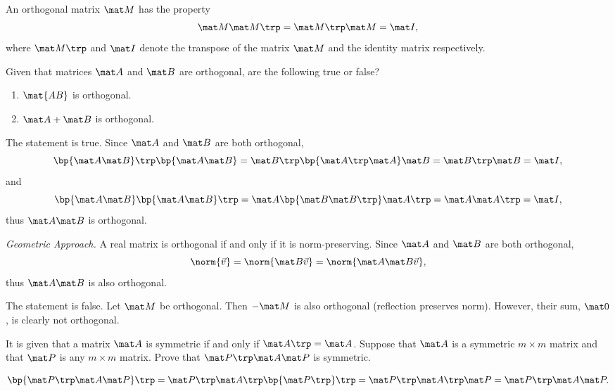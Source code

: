 \begin{problem}
    An orthogonal matrix $\mat M$ has the property \[\mat M \mat M \trp = \mat M \trp \mat M = \mat I,\] where $\mat M \trp$ and $\mat I$ denote the transpose of the matrix $\mat M$ and the identity matrix respectively.

    Given that matrices $\mat A$ and $\mat B$ are orthogonal, are the following true or false?
    \begin{enumerate}
        \item $\mat{AB}$ is orthogonal.
        \item $\mat A + \mat B$ is orthogonal.
    \end{enumerate}
\end{problem}
\begin{solution}
    \begin{ppart}
        The statement is true. Since $\mat A$ and $\mat B$ are both orthogonal, \[\bp{\mat A \mat B}\trp \bp{\mat A \mat B} = \mat B\trp \bp{\mat A \trp \mat A} \mat B = \mat B \trp \mat B = \mat I,\] and \[\bp{\mat A \mat B} \bp{\mat A \mat B}\trp = \mat A \bp{\mat B \mat B \trp} \mat A \trp = \mat A \mat A \trp = \mat I,\] thus $\mat A \mat B$ is orthogonal.

        \noindent\textit{Geometric Approach.} A real matrix is orthogonal if and only if it is norm-preserving. Since $\mat A$ and $\mat B$ are both orthogonal, \[\norm{\vec v} = \norm{\mat B \vec v} = \norm{\mat A \mat B \vec v},\] thus $\mat A \mat B$ is also orthogonal.
    \end{ppart}
    \begin{ppart}
        The statement is false. Let $\mat M$ be orthogonal. Then $-\mat M$ is also orthogonal (reflection preserves norm). However, their sum, $\mat 0$, is clearly not orthogonal.
    \end{ppart}
\end{solution}

\begin{problem}
    It is given that a matrix $\mat A$ is symmetric if and only if $\mat A \trp = \mat A$. Suppose that $\mat A$ is a symmetric $m \times m$ matrix and that $\mat P$ is any $m \times m$ matrix. Prove that $\mat P \trp \mat A \mat P$ is symmetric.
\end{problem}
\begin{solution}
    \[\bp{\mat P \trp \mat A \mat P}\trp = \mat P \trp \mat A \trp \bp{\mat P \trp}\trp = \mat P \trp \mat A \trp \mat P = \mat P \trp \mat A \mat P.\]
\end{solution}


